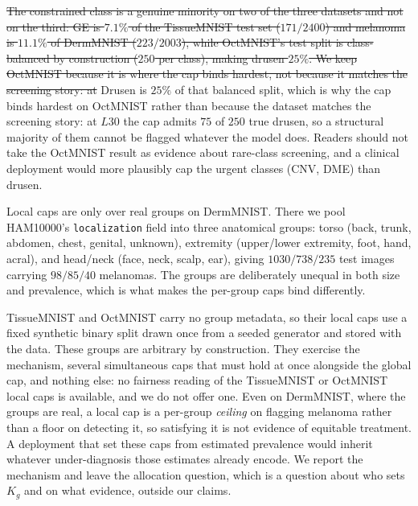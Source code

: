 \documentclass[10pt]{article}
\newcommand{\del}[1]{{\color{red}\sout{#1}}}
\begin{document}
\del{The constrained class is a genuine minority on two of the three
datasets and not on the third: GE is $7.1\%$ of the TissueMNIST test
set ($171/2400$) and melanoma is $11.1\%$ of DermMNIST ($223/2003$),
while OctMNIST's test split is class-balanced by construction ($250$
per class), making drusen $25\%$. We keep OctMNIST because it is where
the cap binds hardest, not because it matches the screening story: at}%
{\color{blue}Drusen is $25\%$ of that balanced split, which is why the cap
binds hardest on OctMNIST rather than because the dataset matches the
screening story: at} $L30$ the cap admits $75$ of $250$ true drusen, so a structural
majority of them cannot be flagged whatever the model does. Readers
should not take the OctMNIST result as evidence about rare-class
screening, and a clinical deployment would more plausibly cap the
urgent classes (CNV, DME) than drusen.

Local caps are only over real groups on DermMNIST. There we pool
HAM10000's \texttt{localization} field into three anatomical groups:
torso (back, trunk, abdomen, chest, genital, unknown), extremity
(upper/lower extremity, foot, hand, acral), and head/neck (face, neck,
scalp, ear), giving $1030/738/235$ test images carrying $98/85/40$
melanomas. The groups are deliberately unequal in both size and
prevalence, which is what makes the per-group caps bind differently.

TissueMNIST and OctMNIST carry no group metadata, so their local caps
use a fixed synthetic binary split drawn once from a seeded generator
and stored with the data. These groups are arbitrary by construction.
They exercise the mechanism, several simultaneous caps that must hold
at once alongside the global cap, and nothing else: no fairness
reading of the TissueMNIST or OctMNIST local caps is available, and we
do not offer one. Even on DermMNIST, where the groups are real, a
local cap is a per-group \emph{ceiling} on flagging melanoma rather
than a floor on detecting it, so satisfying it is not evidence of
equitable treatment. A deployment that set these caps from estimated
prevalence would inherit whatever under-diagnosis those estimates
already encode. We report the mechanism and leave the allocation
question, which is a question about who sets $K_g$ and on what
evidence, outside our claims.
\end{document}
